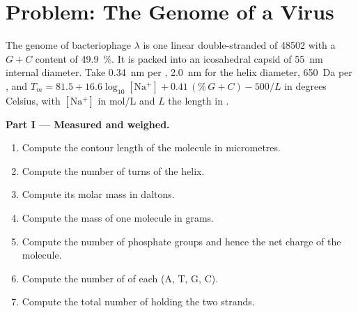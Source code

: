 \section{Problem: The Genome of a Virus}

\begin{problem}
\label{pb:b1:nucleic-acids:1}
The genome of bacteriophage $\lambda$ is one linear double-stranded 
of \num{48502}  with a $G + C$ content of \qty{49.9}{\%}. It
is packed into an icosahedral capsid of \qty{55}{nm} internal diameter.
Take \qty{0.34}{nm} per , \qty{2.0}{nm} for the helix
diameter, \qty{650}{Da} per , and $T_m = 81.5 + 16.6\log_{10}[\mathrm{Na^+}]
+ 0.41\,(\%\,G{+}C) - 500/L$ in degrees Celsius, with $[\mathrm{Na^+}]$
in \unit{mol/L} and $L$ the length in .

\medskip
\noindent\textbf{Part I --- Measured and weighed.}
\begin{enumerate}
  \item Compute the contour length of the molecule in micrometres.
  \item Compute the number of turns of the helix.
  \item Compute its molar mass in daltons.
  \item Compute the mass of one molecule in grams.
  \item Compute the number of phosphate groups and hence the net charge
        of the molecule.
  \item Compute the number of  of each  (A, T, G, C).
  \item Compute the total number of  holding the two
        strands.
\end{enumerate}


\end{problem}

